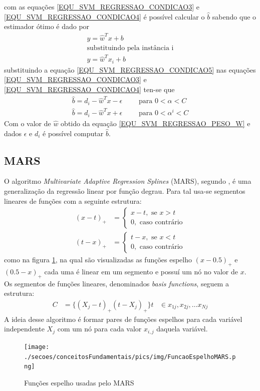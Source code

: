 com as equações \eqref{EQU_SVM_REGRESSAO_CONDICAO3} e \eqref{EQU_SVM_REGRESSAO_CONDICAO4} é possível calcular o \(\hat{b}\) sabendo que o estimador ótimo é dado por
\begin{align}
y = \hat{w}^{T}x + b \\
\nonumber\textrm{substituindo pela instância i} \\
y = \hat{w}^{T}x_{i} + b \label{EQU_SVM_REGRESSAO_CONDICAO5}
\end{align}
substituindo a equação \eqref{EQU_SVM_REGRESSAO_CONDICAO5} nas equações \eqref{EQU_SVM_REGRESSAO_CONDICAO3} e \eqref{EQU_SVM_REGRESSAO_CONDICAO4} ten-se que
\begin{align}
\hat{b} = d_{i} -\hat{w}^{T}x -\epsilon	\qquad \textrm{ para } 0 < \alpha < C		\label{EQU_SVM_REGRESSAO_CONDICAO6}\\
\hat{b} = d_{i} -\hat{w}^{T}x +\epsilon	\qquad \textrm{ para }  0 < \alpha^{i} < C	\label{EQU_SVM_REGRESSAO_CONDICAO7}
\end{align}
Com o valor de \(\hat{w}\) obtido da equação \eqref{EQU_SVM_REGRESSAO_PESO_W} e dados \(\epsilon\) e \(d_{i}\) é possível computar \(\hat{b}\).
\subsection{MARS}
O algoritmo \emph{Multivariate Adaptive Regression Splines} (MARS), segundo , é uma generalização da regressão linear por função degrau. Para tal usa-se segmentos lineares de funções com a seguinte estrutura:
\begin{align}
(x-t)_{+} &= \begin{cases}
x-t, \textrm{ se } x > t \\
0,   \textrm{ caso contrário}
\end{cases}
\\
(t-x)_{+} &= \begin{cases}
t-x, \textrm{ se } x < t \\
0, \textrm{ caso contrário}
\end{cases} 
\end{align}
como na figura \ref{FIGURA_MARS_FUNCAO_ESPELHO}, na qual são visualizadas as funções espelho \((x-0.5)_{+}\) e \((0.5-x)_{+}\) cada uma é linear em um segmento e possuí um nó no valor de \(x\). Os segmentos de funções lineares, denominados \emph{basis functions}, seguem a estrutura:
\begin{align}
C &= \{(X_{j}-t)_{+}(t-X_{j})_{+}\} t &\in {x_{1j}, x_{2j}, \ldots x_{Nj}} \label{EQU_CONJUNTO_FUNCOES_DEGRAU}
\end{align}
A ideia desse algoritmo é formar pares de funções espelhos para cada variável independente \(X_{j}\) com um nó para cada valor \(x_{i,j}\) daquela variável.
\begin{figure}[hbt]
	\centering
 	  \caption{Funções espelho usadas pelo MARS}
		\texttt{[image: ./secoes/conceitosFundamentais/pics/img/FuncaoEspelhoMARS.png]}
	\label{FIGURA_MARS_FUNCAO_ESPELHO}
\end{figure}

